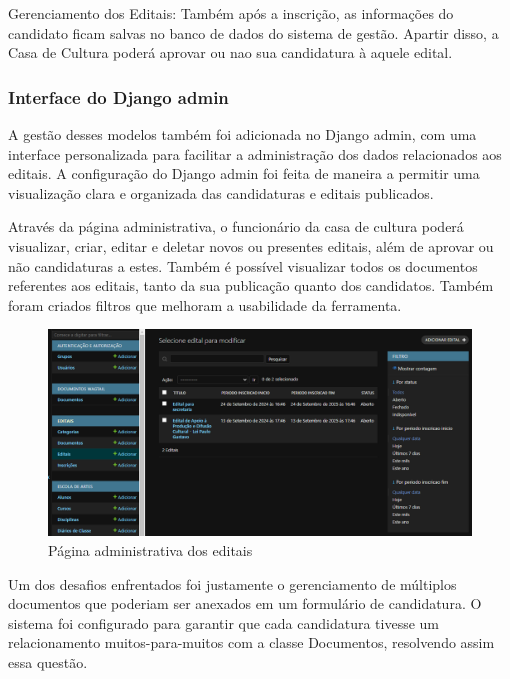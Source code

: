 Gerenciamento dos Editais: Também após a inscrição, as informações do candidato ficam salvas no banco de dados do sistema de gestão. Apartir disso, a Casa de Cultura poderá aprovar ou nao sua candidatura à aquele edital.

\subsubsection{Interface do Django admin}

A gestão desses modelos também foi adicionada no Django admin, com uma interface personalizada para facilitar a administração dos dados relacionados aos editais. A configuração do Django admin foi feita de maneira a permitir uma visualização clara e organizada das candidaturas e editais publicados.

Através da página administrativa, o funcionário da casa de cultura poderá visualizar, criar, editar e deletar novos ou presentes editais, além de aprovar ou não candidaturas a estes. Também é possível visualizar todos os documentos referentes aos editais, tanto da sua publicação quanto dos candidatos. Também foram criados filtros que melhoram a usabilidade da ferramenta.

\begin{figure}[htb]
	\caption{\label{fig_grafico}Página administrativa dos editais}
	\begin{center}
	    \includegraphics[scale=0.45]{./img/admin_edital.png}
	\end{center}
\end{figure}


Um dos desafios enfrentados foi justamente o gerenciamento de múltiplos documentos que poderiam ser anexados em um formulário de candidatura. O sistema foi configurado para garantir que cada candidatura tivesse um relacionamento muitos-para-muitos com a classe Documentos, resolvendo assim essa questão.

